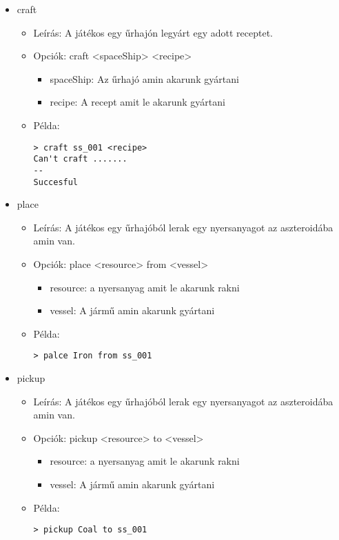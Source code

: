 \documentclass[../../projlab]{subfiles}
\begin{document}
\begin{itemize}
    \item craft
    \begin{itemize}
        \item Leírás: A játékos egy űrhajón legyárt egy adott receptet.
        \item Opciók: craft <spaceShip> <recipe>
        \begin{itemize}
            \item spaceShip: Az űrhajó amin akarunk gyártani
            \item recipe: A recept amit le akarunk gyártani
        \end{itemize}
        \item Példa:
            \begin{verbatim}
> craft ss_001 <recipe>
Can't craft .......
--
Succesful
            \end{verbatim}
    \end{itemize}


    \item place
    \begin{itemize}
        \item Leírás: A játékos egy űrhajóból lerak egy nyersanyagot az aszteroidába amin van.
        \item Opciók: place <resource> from <vessel>
        \begin{itemize}
            \item resource: a nyersanyag amit le akarunk rakni
            \item vessel: A jármű amin akarunk gyártani
        \end{itemize}
        \item Példa:
            \begin{verbatim}
> palce Iron from ss_001
            \end{verbatim}
    \end{itemize}

    \item pickup
    \begin{itemize}
        \item Leírás: A játékos egy űrhajóból lerak egy nyersanyagot az aszteroidába amin van.
        \item Opciók: pickup <resource> to <vessel>
        \begin{itemize}
            \item resource: a nyersanyag amit le akarunk rakni
            \item vessel: A jármű amin akarunk gyártani
        \end{itemize}
        \item Példa:
            \begin{verbatim}
> pickup Coal to ss_001
            \end{verbatim}
    \end{itemize}



\end{itemize}
\end{document}
